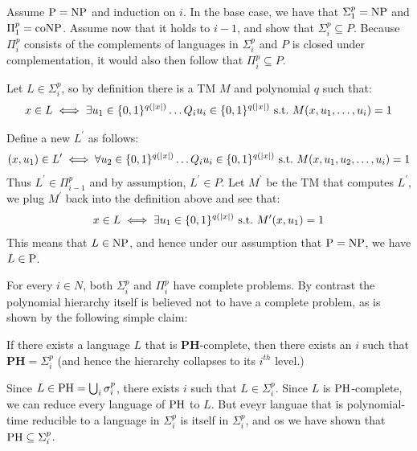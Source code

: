 \begin{note}[Sketch for Collapse at $\PTIME = \NP$]
  Assume $\PTIME = \NP$ and induction on $i$.
  In the base case, we have that $\Sigma_{1}^p = \mathrm{NP}$ and
  $\Pi_{1}^p = \mathrm{coNP}$.
  Assume now that it holds to $i - 1$, and show
  that $\Sigma_{i}^p \subseteq P$.
  Because $\Pi_i ^p$ consists of the complements of languages in $\Sigma_i ^p$
  and $P$ is closed under complementation, it would also then follow that
  $\Pi_i ^p \subseteq P$.

  Let $L \in \Sigma_{i} ^p$, so by definition there is a TM $M$ and
  polynomial $q$ such that:
  \begin{align*}
    x \in L \iff \exists u_1 \in \{0, 1\}^{q(|x|)} \dots
    Q_i u_i \in \{0, 1\}^{q(|x|)} \mathrm{\ s.t.\ } M(x, u_1, \dots, u_i) = 1
  \end{align*}

  Define a new $L^\prime$ as follows:
  \begin{align*}
    (x, u_1) \in L^\prime \iff
    \forall u_2 \in \{0, 1\}^{q(|x|)} \dots Q_i u_i \in \{0, 1\}^{q(|x|)}
    \mathrm{\ s.t.\ } M(x, u_1, u_2, \dots, u_i) = 1
  \end{align*}
  Thus $L^\prime \in \Pi_{i - 1} ^p$ and by assumption, $L^\prime \in P$.
  Let $M^\prime$ be the TM that computes $L^\prime$, we plug $M^\prime$ back
  into the definition above and see that:
  \begin{align*}
    x \in L \iff \exists u_1 \in \{0, 1\}^{q(|x|)}
    \mathrm{\ s.t.\ } M^\prime (x, u_1) = 1
  \end{align*}
  This means that $L \in \mathrm{NP}$, and hence under our assumption that
  $\PTIME = \NP$, we have $L \in \mathrm{P}$.
\end{note}

\begin{note}
For every $i \in N$, both $\Sigma_{i}^{p}$ and $\Pi_{i}^{p}$ have
complete problems.
By contrast the polynomial hierarchy itself is believed not to have a
complete problem, as is shown by the following simple claim:

If there exists a language $L$ that is $\textbf{PH}$-complete,
then there exists an $i$ such that $\textbf{PH} = \Sigma_{i}^{p}$
(and hence the hierarchy collapses to its $i^{th}$ level.)
\end{note}

\begin{note}
  Since $L \in \mathrm{PH} = \bigcup_i \sigma_i ^p$, there exists $i$ such that
  $L \in \Sigma_i ^p$.
  Since $L$ is $\mathrm{PH}$-complete, we can reduce every language of $\mathrm{PH}$ to $L$.
  But eveyr languae that is polynomial-time reducible to a language in
  $\Sigma_i ^p$ is itself in $\Sigma_i ^p$, and os we have shown that
  $\mathrm{PH} \subseteq \Sigma_i ^p$.
\end{note}

